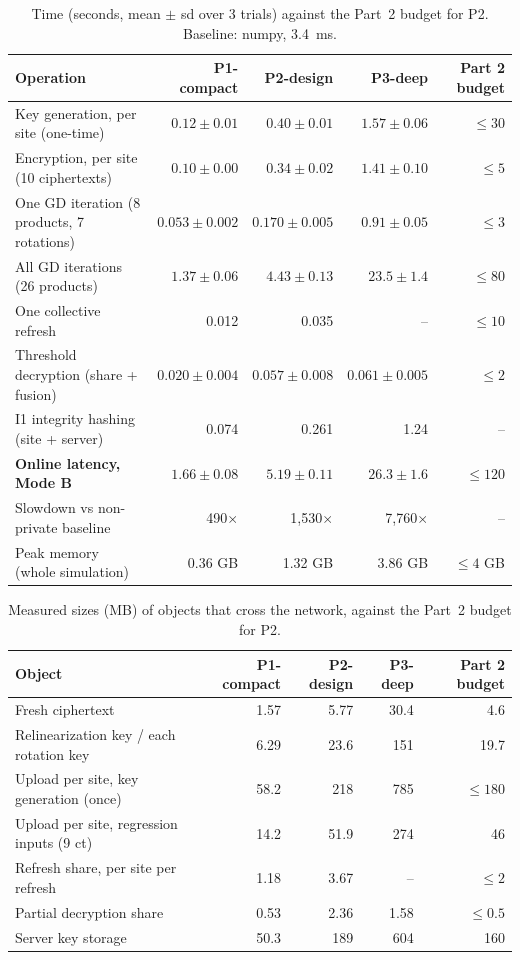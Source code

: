 \documentclass[11pt]{article}
\begin{document}
\begin{table}[H]
\centering\small
\caption{Time (seconds, mean $\pm$ sd over 3 trials) against the Part~2 budget for P2. Baseline: numpy, 3.4~ms.}\label{tab:time}
\begin{tabularx}{\textwidth}{@{}lRRRr@{}}
\toprule
\textbf{Operation} & \textbf{P1-compact} & \textbf{P2-design} & \textbf{P3-deep} & \textbf{Part 2 budget} \\
\midrule
Key generation, per site (one-time) & $0.12\pm0.01$ & $0.40\pm0.01$ & $1.57\pm0.06$ & $\le 30$ \\
Encryption, per site (10 ciphertexts) & $0.10\pm0.00$ & $0.34\pm0.02$ & $1.41\pm0.10$ & $\le 5$ \\
One GD iteration (8 products, 7 rotations) & $0.053\pm0.002$ & $0.170\pm0.005$ & $0.91\pm0.05$ & $\le 3$ \\
All GD iterations (26 products) & $1.37\pm0.06$ & $4.43\pm0.13$ & $23.5\pm1.4$ & $\le 80$ \\
One collective refresh & 0.012 & 0.035 & -- & $\le 10$ \\
Threshold decryption (share + fusion) & $0.020\pm0.004$ & $0.057\pm0.008$ & $0.061\pm0.005$ & $\le 2$ \\
I1 integrity hashing (site + server) & 0.074 & 0.261 & 1.24 & -- \\
\textbf{Online latency, Mode B} & $\mathbf{1.66\pm0.08}$ & $\mathbf{5.19\pm0.11}$ & $\mathbf{26.3\pm1.6}$ & $\le 120$ \\
Slowdown vs non-private baseline & 490$\times$ & 1{,}530$\times$ & 7{,}760$\times$ & -- \\
Peak memory (whole simulation) & 0.36 GB & 1.32 GB & 3.86 GB & $\le 4$ GB \\
\bottomrule
\end{tabularx}
\end{table}

\begin{table}[H]
\centering\small
\caption{Measured sizes (MB) of objects that cross the network, against the Part~2 budget for P2.}\label{tab:size}
\begin{tabularx}{\textwidth}{@{}lRRRr@{}}
\toprule
\textbf{Object} & \textbf{P1-compact} & \textbf{P2-design} & \textbf{P3-deep} & \textbf{Part 2 budget} \\
\midrule
Fresh ciphertext & 1.57 & 5.77 & 30.4 & 4.6 \\
Relinearization key / each rotation key & 6.29 & 23.6 & 151 & 19.7 \\
Upload per site, key generation (once) & 58.2 & 218 & 785 & $\le 180$ \\
Upload per site, regression inputs (9 ct) & 14.2 & 51.9 & 274 & 46 \\
Refresh share, per site per refresh & 1.18 & 3.67 & -- & $\le 2$ \\
Partial decryption share & 0.53 & 2.36 & 1.58 & $\le 0.5$ \\
Server key storage & 50.3 & 189 & 604 & 160 \\
\bottomrule
\end{tabularx}
\end{table}
\end{document}
